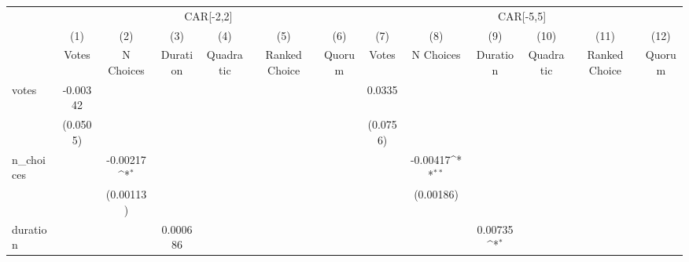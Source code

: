 {
\def\sym#1{\ifmmode^{#1}\else\(^{#1}\)\fi}
\begin{tabular}{l*{12}{c}}
\hline\hline
                    &\multicolumn{6}{c}{CAR[-2,2]}                                                                                                      &\multicolumn{6}{c}{CAR[-5,5]}                                                                                                      \\
                    &\multicolumn{1}{c}{(1)}&\multicolumn{1}{c}{(2)}&\multicolumn{1}{c}{(3)}&\multicolumn{1}{c}{(4)}&\multicolumn{1}{c}{(5)}&\multicolumn{1}{c}{(6)}&\multicolumn{1}{c}{(7)}&\multicolumn{1}{c}{(8)}&\multicolumn{1}{c}{(9)}&\multicolumn{1}{c}{(10)}&\multicolumn{1}{c}{(11)}&\multicolumn{1}{c}{(12)}\\
                    &\multicolumn{1}{c}{Votes}&\multicolumn{1}{c}{N Choices}&\multicolumn{1}{c}{Duration}&\multicolumn{1}{c}{Quadratic}&\multicolumn{1}{c}{Ranked Choice}&\multicolumn{1}{c}{Quorum}&\multicolumn{1}{c}{Votes}&\multicolumn{1}{c}{N Choices}&\multicolumn{1}{c}{Duration}&\multicolumn{1}{c}{Quadratic}&\multicolumn{1}{c}{Ranked Choice}&\multicolumn{1}{c}{Quorum}\\
\hline
votes               &    -0.00342         &                     &                     &                     &                     &                     &      0.0335         &                     &                     &                     &                     &                     \\
                    &    (0.0505)         &                     &                     &                     &                     &                     &    (0.0756)         &                     &                     &                     &                     &                     \\
n\_choices           &                     &    -0.00217\sym{*}  &                     &                     &                     &                     &                     &    -0.00417\sym{**} &                     &                     &                     &                     \\
                    &                     &   (0.00113)         &                     &                     &                     &                     &                     &   (0.00186)         &                     &                     &                     &                     \\
duration            &                     &                     &    0.000686         &                     &                     &                     &                     &                     &     0.00735\sym{*}  &                     &                     &                     \\

\end{tabular}}

